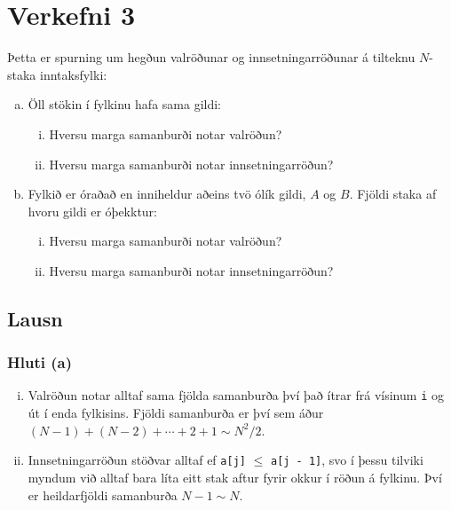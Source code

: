 \documentclass[12pt, a4paper, hidelinks]{article}
\begin{document}

\newpage

\section*{Verkefni 3}
Þetta er spurning um hegðun valröðunar og innsetningarröðunar á tilteknu $N$-staka inntaksfylki:
\begin{enumerate}[(a)]
    \item Öll stökin í fylkinu hafa sama gildi:
    \begin{enumerate}[(i)]
        \item Hversu marga samanburði notar valröðun?
        \item Hversu marga samanburði notar innsetningarröðun?
    \end{enumerate}
    \item Fylkið er óraðað en inniheldur aðeins tvö ólík gildi, $A$ og $B$. Fjöldi staka af hvoru
    gildi er óþekktur:
    \begin{enumerate}[(i)]
        \item Hversu marga samanburði notar valröðun?
        \item Hversu marga samanburði notar innsetningarröðun?
    \end{enumerate}
\end{enumerate}

\subsection*{Lausn}
\subsubsection*{Hluti (a)}
    \begin{enumerate}[(i)]
        \item Valröðun notar alltaf sama fjölda samanburða því það ítrar frá vísinum \texttt{i}
        og út í enda fylkisins. Fjöldi samanburða er því sem áður $(N - 1) + (N - 2) + \cdots + 2 + 1 \sim N^2/2$.
        \item Innsetningarröðun stöðvar alltaf ef \texttt{a[j]} $\leq$ \texttt{a[j - 1]}, svo í þessu tilviki myndum við alltaf
        bara líta eitt stak aftur fyrir okkur í röðun á fylkinu. Því er heildarfjöldi samanburða $N - 1 \sim N$.
    \end{enumerate}
\end{document}

